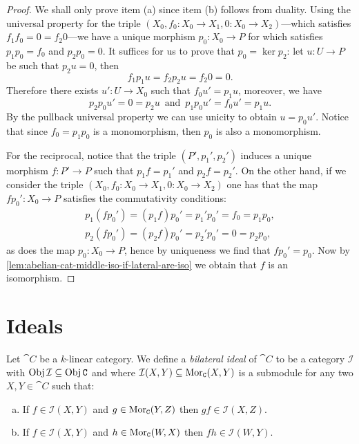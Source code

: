 \begin{proof}
    We shall only prove item (a) since item (b) follows from duality. Using the
    universal property for the triple
    \((X_0, f_0: X_0 \to X_1, 0: X_0 \to X_2)\)---which satisfies
    \(f_1 f_0 = 0 = f_2 0\)---we have a unique morphism \(p_0: X_0 \to P\) for which
    satisfies \(p_1 p_0 = f_0\) and \(p_2 p_0 = 0\). It suffices for us to prove
    that \(p_0 = \ker p_2\): let \(u: U \to P\) be such that \(p_2 u = 0\), then
    \[
        f_1 p_1 u = f_2 p_2 u  = f_2 0 = 0.
    \]
    Therefore there exists \(u': U \to X_0\) such that \(f_0 u' = p_1 u\), moreover,
    we have
    \[
        p_2 p_0 u' = 0 = p_2 u\, \text{ and }\, p_1 p_0 u' = f_0 u' = p_1 u.
    \]
    By the pullback universal property we can use unicity to obtain \(u = p_0
    u'\). Notice that since \(f_0 = p_1 p_0\) is a monomorphism, then \(p_0\) is
    also a monomorphism.

    For the reciprocal, notice that the triple \((P', p_1', p_2')\) induces a unique
    morphism \(f: P' \to P\) such that \(p_1 f = p_1'\) and \(p_2 f = p_2'\). On the
    other hand, if we consider the triple
    \((X_0, f_0: X_0 \to X_1, 0: X_0 \to X_2)\) one has that the map
    \(f p_0': X_0 \to P\) satisfies the commutativity conditions:
    \begin{gather*}
        p_1 (f p_0') = (p_1 f) p_0' = p_1' p_0' = f_0 = p_1 p_0, \\
        p_2 (f p_0') = (p_2 f) p_0' = p_2' p_0' = 0 = p_2 p_0,
    \end{gather*}
    as does the map \(p_0: X_0 \to P\), hence by uniqueness we find that
    \(f p_0' = p_0\). Now by \cref{lem:abelian-cat-middle-iso-if-lateral-are-iso} we
    obtain that \(f\) is an isomorphism.
\end{proof}

\section{Ideals}

\begin{definition}
    \label{def:k-linear-cat-bilateral-ideal}
    Let \(\cat C\) be a \(k\)-linear category. We define a \emph{bilateral ideal} of
    \(\cat C\) to be a category \(\mathcal{I}\) with
    \(\operatorname{Obj} \mathcal{I} \subseteq \operatorname{Obj} \texttt C\) and where \(\mathcal{I}(X, Y) \subseteq \operatorname{Mor}_{\texttt C}(X, Y)\) is a
    submodule for any two \(X, Y \in \cat C\) such that:
    \begin{enumerate}[(a)]\setlength\itemsep{0em}
        \item If \(f \in \mathcal{I}(X, Y)\) and \(g \in \operatorname{Mor}_{\texttt C}(Y, Z)\) then \(g f \in \mathcal{I}(X, Z)\).

        \item If \(f \in \mathcal{I}(X, Y)\) and \(h \in \operatorname{Mor}_{\texttt C}(W, X)\) then \(f h \in \mathcal{I}(W, Y)\).
    \end{enumerate}
\end{definition}

